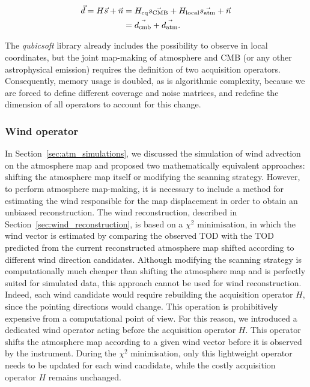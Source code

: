 \documentclass[a4paper,11pt]{article}
\begin{document}
\begin{align}
    \vec{d} = H\vec{s} + \vec{n} &= H_\text{eq}\vec{s_\text{CMB}} + H_\text{local}\vec{s_\text{atm}} + \vec{n} \notag \\
    &= \vec{d_\text{cmb}} + \vec{d_\text{atm}}.
\end{align}

The \emph{qubicsoft} library already includes the possibility to observe in local coordinates, but the joint map-making of atmosphere and CMB (or any other astrophysical emission) requires the definition of two acquisition operators. Consequently, memory usage is doubled, as is algorithmic complexity, because we are forced to define different coverage and noise matrices, and redefine the dimension of all operators to account for this change.


\subsubsection{Wind operator}
\label{sec:wind_operator}

In Section~\ref{sec:atm_simulations}, we discussed the simulation of wind advection on the atmosphere map and proposed two mathematically equivalent approaches: shifting the atmosphere map itself or modifying the scanning strategy. However, to perform atmosphere map-making, it is necessary to include a method for estimating the wind responsible for the map displacement in order to obtain an unbiased reconstruction.
The wind reconstruction, described in Section~\ref{sec:wind_reconstruction}, is based on a $\chi^2$ minimisation, in which the wind vector is estimated by comparing the observed TOD with the TOD predicted from the current reconstructed atmosphere map shifted according to different wind direction candidates.
Although modifying the scanning strategy is computationally much cheaper than shifting the atmosphere map and is perfectly suited for simulated data, this approach cannot be used for wind reconstruction. Indeed, each wind candidate would require rebuilding the acquisition operator $H$, since the pointing directions would change. This operation is prohibitively expensive from a computational point of view.
For this reason, we introduced a dedicated wind operator acting before the acquisition operator $H$. This operator shifts the atmosphere map according to a given wind vector before it is observed by the instrument. During the $\chi^2$ minimisation, only this lightweight operator needs to be updated for each wind candidate, while the costly acquisition operator $H$ remains unchanged.
\end{document}
